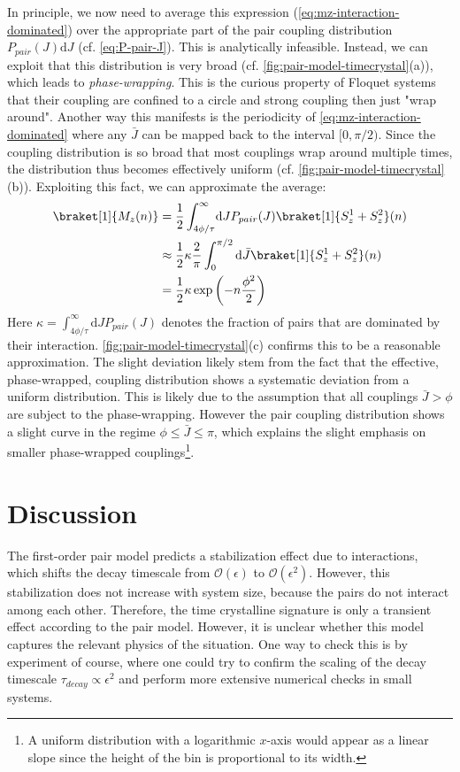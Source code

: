 In principle, we now need to average this expression (\autoref{eq:mz-interaction-dominated}) over the appropriate part of the pair coupling distribution $P_{pair}(J)\mathrm{d}J$ (cf. \autoref{eq:P-pair-J}). This is analytically infeasible. Instead, we can exploit that this distribution is very broad (cf. \autoref{fig:pair-model-timecrystal}(a)), which leads to \emph{phase-wrapping}. This is the curious property of Floquet systems that their coupling are confined to a circle and strong coupling then just "wrap around".  Another way this manifests is the periodicity of \autoref{eq:mz-interaction-dominated} where any $\bar{J}$ can be mapped back to the interval $[0,\pi/2)$. Since the coupling distribution is so broad that most couplings wrap around multiple times, the distribution thus becomes effectively uniform (cf. \autoref{fig:pair-model-timecrystal}(b)). Exploiting this fact, we can approximate the average:
\begin{align}
	\braket[1]{M_z(n)} &= \frac{1}{2}\int_{4\phi/\tau}^\infty\!\mathrm{d}J P_{pair}(J) \braket[1]{S_z^1+S_z^2}(n) \\
	&\approx \frac{1}{2} \kappa \frac{2}{\pi}\int_{0}^{\pi/2} \mathrm{d}\bar{J} \braket[1]{S_z^1+S_z^2}(n) \\
	&= \frac{1}{2} \kappa \exp\left(-n\frac{\phi^2}2\right)
\end{align}
Here $\kappa=\int_{4\phi/\tau}^{\infty}\!\mathrm{d}JP_{pair}(J)$ denotes the fraction of pairs that are dominated by their interaction. \autoref{fig:pair-model-timecrystal}(c) confirms this to be a reasonable approximation. The slight deviation likely stem from the fact that the effective, phase-wrapped, coupling distribution shows a systematic deviation from a uniform distribution. This is likely due to the assumption that all couplings $\bar{J}>\phi$ are subject to the phase-wrapping. However the pair coupling distribution shows a slight curve in the regime $\phi\leq\bar{J}\leq\pi$, which explains the slight emphasis on smaller phase-wrapped couplings\footnote{A uniform distribution with a logarithmic $x$-axis would appear as a linear slope since the height of the bin is proportional to its width.}.

\section{Discussion}
The first-order pair model predicts a stabilization effect due to interactions, which shifts the decay timescale from $\mathcal{O}(\epsilon)$ to $\mathcal{O}(\epsilon^2)$. However, this stabilization does not increase with system size, because the pairs do not interact among each other. Therefore, the time crystalline signature is only a transient effect according to the pair model. However, it is unclear whether this  model captures the relevant physics of the situation. One way to check this is by experiment of course, where one could try to confirm the scaling of the decay timescale $\tau_{decay}\propto\epsilon^2$ and perform more extensive numerical checks in small systems.

